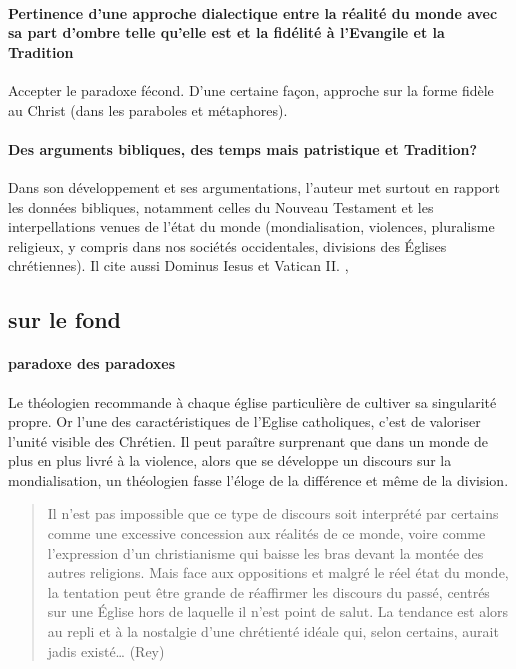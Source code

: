  \paragraph{Pertinence d'une approche dialectique entre la réalité du monde avec sa part d'ombre telle qu'elle est et la fidélité à l'Evangile et la Tradition}
Accepter le paradoxe fécond. 
D'une certaine façon, approche sur la forme fidèle au Christ (dans les paraboles et métaphores).


\paragraph{Des arguments bibliques, des temps mais patristique et Tradition?}
Dans son développement et ses argumentations, l’auteur met surtout en rapport les données bibliques, notamment celles du Nouveau Testament et les interpellations venues de l’état du monde (mondialisation, violences, pluralisme religieux, y compris dans nos sociétés occidentales, divisions des Églises chrétiennes). Il cite aussi Dominus Iesus et Vatican II. ,
 


\subsection{sur le fond}

\paragraph{paradoxe des paradoxes} Le théologien recommande à chaque église particulière de cultiver sa singularité propre. Or l'une des caractéristiques de l'Eglise catholiques, c'est de valoriser l'unité visible des Chrétien. 
Il peut paraître surprenant que dans un monde de plus en plus livré à la violence, alors que se développe un discours sur la mondialisation, un théologien fasse l’éloge de la différence et même de la division. 

\begin{quote}
Il n’est pas impossible que ce type de discours soit interprété par certains comme une excessive concession aux réalités de ce monde, voire comme l’expression d’un christianisme qui baisse les bras devant la montée des autres religions. Mais face aux oppositions et malgré le réel état du monde, la tentation peut être grande de réaffirmer les discours du passé, centrés sur une Église hors de laquelle il n’est point de salut. La tendance est alors au repli et à la nostalgie d’une chrétienté idéale qui, selon certains, aurait jadis existé… (Rey)
    
\end{quote}



